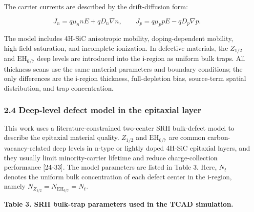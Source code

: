 \documentclass[
  10pt,
  a4paper,
]{article}
\begin{document}
The carrier currents are described by the drift-diffusion form:

\[
J_n=q\mu_n nE+qD_n\nabla n,\qquad
J_p=q\mu_p pE-qD_p\nabla p.
\]

The model includes 4H-SiC anisotropic mobility, doping-dependent
mobility, high-field saturation, and incomplete ionization. In defective
materials, the \(Z_{1/2}\) and \(\mathrm{EH}_{6/7}\) deep levels are
introduced into the i-region as uniform bulk traps. All thickness scans
use the same material parameters and boundary conditions; the only
differences are the i-region thickness, full-depletion bias, source-term
spatial distribution, and trap concentration.

\subsubsection{2.4 Deep-level defect model in the epitaxial
layer}\label{deep-level-defect-model-in-the-epitaxial-layer}

This work uses a literature-constrained two-center SRH bulk-defect model
to describe the epitaxial material quality. \(Z_{1/2}\) and
\(\mathrm{EH}_{6/7}\) are common carbon-vacancy-related deep levels in
n-type or lightly doped 4H-SiC epitaxial layers, and they usually limit
minority-carrier lifetime and reduce charge-collection performance
{[}24-33{]}. The model parameters are listed in Table 3. Here, \(N_t\)
denotes the uniform bulk concentration of each defect center in the
i-region, namely \(N_{Z_{1/2}}=N_{\mathrm{EH}_{6/7}}=N_t\).

\textbf{Table 3. SRH bulk-trap parameters used in the TCAD simulation.}
\end{document}
